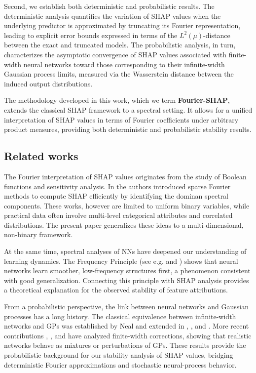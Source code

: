 \documentclass[letterpaper,11pt]{article}
\numberwithin{equation}{section}
\numberwithin{equation}{section}
\begin{document}
Second, we establish both deterministic and probabilistic results. The deterministic analysis quantifies the variation of SHAP values when the underlying predictor is approximated by truncating its Fourier representation, leading to explicit error bounds expressed in terms of the $L^2(\mu)$-distance between the exact and truncated models. The probabilistic analysis, in turn, characterizes the asymptotic convergence of SHAP values associated with finite-width neural networks toward those corresponding to their infinite-width Gaussian process limits, measured via the Wasserstein distance between the induced output distributions.

The methodology developed in this work, which we term {\bf Fourier-SHAP}, extends the classical SHAP framework to a spectral setting. It allows for a unified interpretation of SHAP values in terms of Fourier coefficients under arbitrary product measures, providing both deterministic and probabilistic stability results.

\subsection{Related works}

The Fourier interpretation of SHAP values originates from the study of Boolean functions and sensitivity analysis. In \cite{gorji2024shap} the authors introduced sparse Fourier methods to compute SHAP efficiently by identifying the dominan spectral components. These works, however are limited to uniform binary variables, while practical data often involve multi-level categorical attributes and correlated distributions. The present paper generalizes these ideas to a multi-dimensional, non-binary framework.

At the same time, spectral analyses of NNs have deepened our understanding of learning dynamics. The Frequency Principle (see e.g. \cite{rahaman2019spectral} and  \cite{xu2019frequency}) shows that neural networks learn smoother, low-frequency structures first, a phenomenon consistent with good generalization. Connecting this principle with SHAP analysis provides a theoretical explanation for the observed stability of feature attributions. 

From a probabilistic perspective, the link between neural networks and Gaussian processes has a long history. The classical equivalence between infinite-width networks and GPs was established by Neal \cite{neal2012bayesian} and extended in \cite{lee2017deep}, \cite{lee2019wide}, and \cite{yang2019wide}. More recent contributions \cite{agrawal2020wide}, \cite{adams2024finite}, \cite{yaida2020non} and \cite{parhi2025random} have analyzed finite-width corrections, showing that realistic networks behave as mixtures or perturbations of GPs. These results provide the probabilistic background for our stability analysis of SHAP values, bridging deterministic Fourier approximations and stochastic neural-process behavior. 
\end{document}
